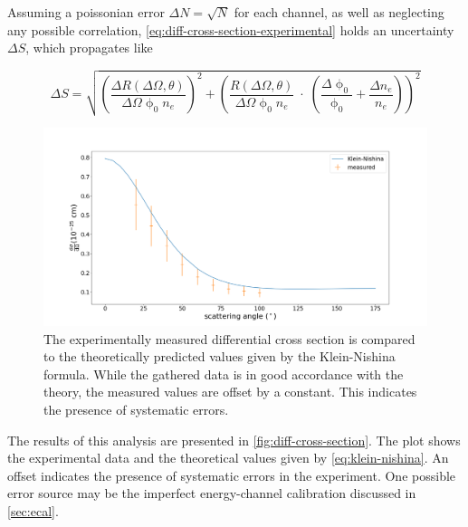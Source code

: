 Assuming a poissonian error $\Delta N = \sqrt{N}$ for each channel, as well as
neglecting any possible correlation, \autoref{eq:diff-cross-section-experimental}
holds an uncertainty $\Delta S$, which propagates like

\begin{equation}
\label{eq:cross-section-error}
	\Delta S = \sqrt{ \left(\frac{\Delta R(\Delta\Omega,\theta)}{\Delta\Omega\upphi_0 n_e} \right)^2 + \left(\frac{R(\Delta\Omega,\theta)}{\Delta\Omega\upphi_0 n_e}\;\cdot\;(\frac{\Delta\upphi_0}{\upphi_0} + \frac{\Delta n_e}{n_e} ) \right)^2 }
\end{equation}

\begin{figure}
	\centering
	\includegraphics[width=1.0\textwidth]{./fig/differential-cross-section.png}
	\caption{The experimentally measured differential cross section is compared
	to the theoretically predicted values given by the Klein-Nishina formula.
	While the gathered data is in good accordance with the theory, the measured
	values are offset by a constant. This indicates the presence of systematic
	errors.}
	\label{fig:diff-cross-section}
\end{figure}

The results of this analysis are presented in \autoref{fig:diff-cross-section}. 
The plot shows the experimental data and the theoretical values given by \autoref{eq:klein-nishina}.
An offset indicates the presence of systematic errors in the
experiment. One possible error source may be the imperfect energy-channel calibration
discussed in \autoref{sec:ecal}.
